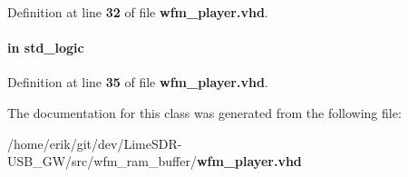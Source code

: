 Definition at line {\bf 32} of file {\bf wfm\+\_\+player.\+vhd}.

\paragraph[{wfm\+\_\+wr}]{ {\bfseries \textcolor{keywordflow}{in}\textcolor{vhdlchar}{ }} {\bfseries \textcolor{comment}{std\+\_\+logic}\textcolor{vhdlchar}{ }} \hspace{0.3cm}{\ttfamily [Port]}}\label{classwfm__player_abae12bc639de975267fe45630d50f5fb}


Definition at line {\bf 35} of file {\bf wfm\+\_\+player.\+vhd}.



The documentation for this class was generated from the following file\+:\begin{DoxyCompactItemize}
\item 
/home/erik/git/dev/\+Lime\+S\+D\+R-\/\+U\+S\+B\+\_\+\+G\+W/src/wfm\+\_\+ram\+\_\+buffer/{\bf wfm\+\_\+player.\+vhd}\end{DoxyCompactItemize}
